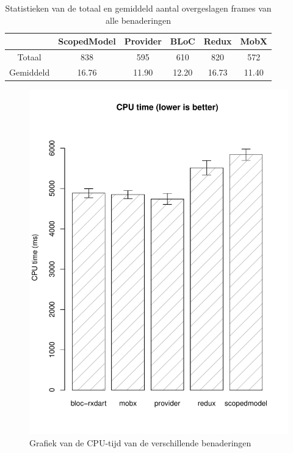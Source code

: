 \begin{table}[H]
    \centering
    \begin{tabular}{c|c|c|c|c|c}
        & \textbf{ScopedModel} & \textbf{Provider} & \textbf{BLoC} & \textbf{Redux} & \textbf{MobX} \\ \hline
        Totaal      &  838   &  595     &  610     &  820    &  572        \\ \hline
        Gemiddeld   &  16.76    &  11.90   &  12.20   &  16.73  &  11.40        \\ 
    \end{tabular}
    \caption{Statistieken van de totaal en gemiddeld aantal overgeslagen frames van alle benaderingen}
    \label{table:experiment-skipped-frames}
\end{table}

\begin{figure}[H]
    \centering
    \includegraphics[width=\linewidth]{img/experiment/cpu_time.pdf}
    \caption{Grafiek van de CPU-tijd van de verschillende benaderingen}
    \label{fig:graph-cpu-time}
\end{figure}

